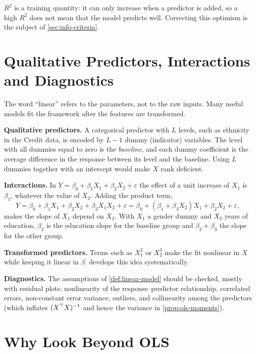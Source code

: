 $R^2$ is a training quantity: it can only increase when a predictor is added, so a high $R^2$ does not mean that the model predicts well. Correcting this optimism is the subject of \cref{sec:info-criteria}.

\section{Qualitative Predictors, Interactions and Diagnostics}\label{sec:linreg-extensions}

The word ``linear'' refers to the parameters, not to the raw inputs. Many useful models fit the framework after the features are transformed.

\smallskip\noindent\textbf{Qualitative predictors.} A categorical predictor with $L$ levels, such as ethnicity in the Credit data, is encoded by $L-1$ dummy (indicator) variables. The level with all dummies equal to zero is the \emph{baseline}, and each dummy coefficient is the average difference in the response between its level and the baseline. Using $L$ dummies together with an intercept would make $X$ rank deficient.

\smallskip\noindent\textbf{Interactions.} In $Y=\beta_0+\beta_1X_1+\beta_2X_2+\varepsilon$ the effect of a unit increase of $X_1$ is $\beta_1$, whatever the value of $X_2$. Adding the product term,
\[
Y=\beta_0+\beta_1X_1+\beta_2X_2+\beta_3X_1X_2+\varepsilon=\beta_0+(\beta_1+\beta_3X_2)X_1+\beta_2X_2+\varepsilon,
\]
makes the slope of $X_1$ depend on $X_2$. With $X_1$ a gender dummy and $X_2$ years of education, $\beta_2$ is the education slope for the baseline group and $\beta_2+\beta_3$ the slope for the other group.

\smallskip\noindent\textbf{Transformed predictors.} Terms such as $X_1^2$ or $X_2^3$ make the fit nonlinear in $X$ while keeping it linear in $\beta$.  develops this idea systematically.

\smallskip\noindent\textbf{Diagnostics.} The assumptions of \cref{def:linear-model} should be checked, mostly with residual plots: nonlinearity of the response--predictor relationship, correlated errors, non-constant error variance, outliers, and collinearity among the predictors (which inflates $(X^{\top} X)^{-1}$ and hence the variance in \cref{prop:ols-moments}).

\section{Why Look Beyond OLS}\label{sec:beyond-ols}

